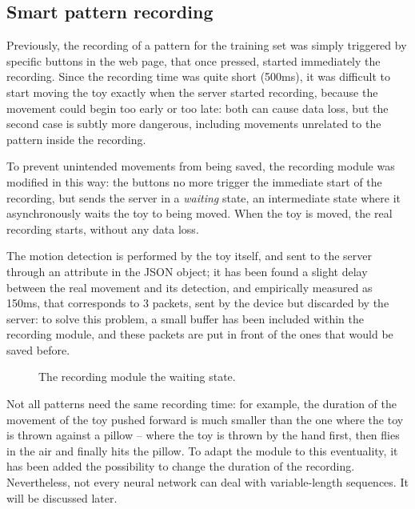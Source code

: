 \subsection{Smart pattern recording}
Previously, the recording of a pattern for the training set was simply triggered by specific buttons in the web page, that once pressed, started immediately the recording. Since the recording time was quite short (500ms), it was difficult to start moving the toy exactly when the server started recording, because the movement could begin too early or too late: both can cause data loss, but the second case is subtly more dangerous, including movements unrelated to the pattern inside the recording.

To prevent unintended movements from being saved, the recording module was modified in this way: the buttons no more trigger the immediate start of the recording, but sends the server in a \textit{waiting} state, an intermediate state where it asynchronously waits the toy to being moved. When the toy is moved, the real recording starts, without any data loss.

The motion detection is performed by the toy itself, and sent to the server through an attribute in the JSON object; it has been found a slight delay between the real movement and its detection, and empirically measured as 150ms, that corresponds to 3 packets, sent by the device but discarded by the server: to solve this problem, a small buffer has been included within the recording module, and these packets are put in front of the ones that would be saved before.

\begin{center}
	\begin{figure}[ht!]
		\caption{The recording module the waiting state.}
	\end{figure}
\end{center}
Not all patterns need the same recording time: for example, the duration of the movement of the toy pushed forward is much smaller than the one where the toy is thrown against a pillow – where the toy is thrown by the hand first, then flies in the air and finally hits the pillow. To adapt the module to this eventuality, it has been added the possibility to change the duration of the recording. Nevertheless, not every neural network can deal with variable-length sequences. It will be discussed later.

